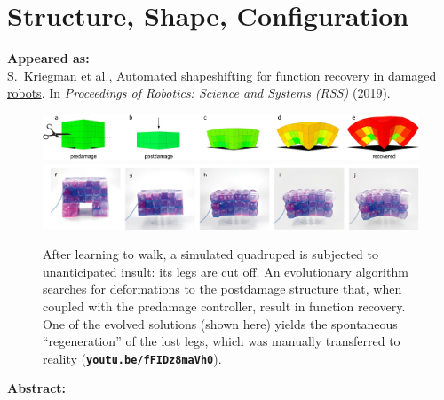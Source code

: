 
\chapter{Structure, Shape, Configuration}

\textbf{Appeared as:}\\
S.~Kriegman et al., 
\href{http://www.roboticsproceedings.org/rss15/p28.html}{\color{blue}Automated shapeshifting for function recovery in damaged robots}. 
In
\textit{Proceedings of Robotics: Science and Systems (RSS)} (2019).

\vspace{0.5em}

\begin{figure}[!h]
    \centering
    \includegraphics[width=\linewidth]{Chapter05/fig/bigger_teaser.jpg} \\
    \includegraphics[trim={0 0 0 4pt},clip,width=\linewidth]{Chapter05/fig/VoxelBotCropped.jpg} \\
    \caption{After learning to walk, a simulated quadruped is subjected to unanticipated insult: its legs are cut off. 
    An evolutionary algorithm searches for deformations to the postdamage structure that, when coupled with the predamage controller, result in function recovery.
    One of the evolved solutions (shown here) yields the spontaneous ``regeneration'' of the lost legs, which was manually transferred to reality 
    (\href{https://youtu.be/fFIDz8maVh0}{\color{blue}\textbf{\texttt{youtu.be/fFIDz8maVh0}}}).
    } 
    \label{fig5:teaser}
\end{figure}

\noindent
\textbf{Abstract:}\\
\noindent












